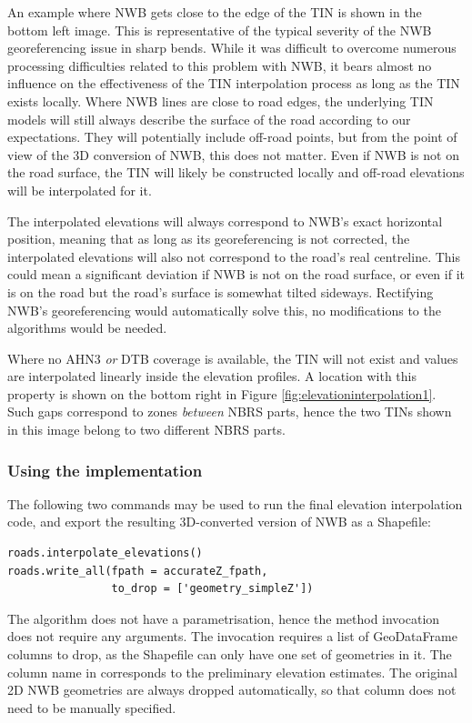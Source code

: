 An example where NWB gets close to the edge of the TIN is shown in the bottom left image. This is representative of the typical severity of the NWB georeferencing issue in sharp bends. While it was difficult to overcome numerous processing difficulties related to this problem with NWB, it bears almost no influence on the effectiveness of the TIN interpolation process as long as the TIN exists locally. Where NWB lines are close to road edges, the underlying TIN models will still always describe the surface of the road according to our expectations. They will potentially include off-road points, but from the point of view of the 3D conversion of NWB, this does not matter. Even if NWB is not on the road surface, the TIN will likely be constructed locally and off-road elevations will be interpolated for it.

The interpolated elevations will always correspond to NWB's exact horizontal position, meaning that as long as its georeferencing is not corrected, the interpolated elevations will also not correspond to the road's real centreline. This could mean a significant deviation if NWB is not on the road surface, or even if it is on the road but the road's surface is somewhat tilted sideways. Rectifying NWB's georeferencing would automatically solve this, no modifications to the algorithms would be needed.

Where no AHN3 \textit{or} DTB coverage is available, the TIN will not exist and values are interpolated linearly inside the elevation profiles. A location with this property is shown on the bottom right in Figure \ref{fig:elevationinterpolation1}. Such gaps correspond to zones \textit{between} NBRS parts, hence the two TINs shown in this image belong to two different NBRS parts.

\subsubsection{Using the implementation}

The following two commands may be used to run the final elevation interpolation code, and export the resulting 3D-converted version of NWB as a Shapefile:

\begin{lstlisting}
roads.interpolate_elevations()
roads.write_all(fpath = accurateZ_fpath,
                to_drop = ['geometry_simpleZ'])
\end{lstlisting}

The algorithm does not have a parametrisation, hence the method invocation does not require any arguments. The  invocation requires a list of GeoDataFrame columns to drop, as the Shapefile can only have one set of geometries in it. The column name in  corresponds to the preliminary elevation estimates. The original 2D NWB geometries are always dropped automatically, so that column does not need to be manually specified.

